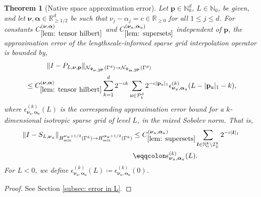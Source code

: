 \documentclass[pdflatex,sn-mathphys-num]{sn-jnl}%
\theoremstyle{thmstyleone}%
\newtheorem{theorem}{Theorem}%
\theoremstyle{thmstyletwo}%
\theoremstyle{thmstylethree}%
\begin{document}
\begin{theorem}[Native space approximation error]\label{thm: error in L}
    Let \(\mathbf{p}\in\mathbb{N}_0^d\), \(L\in\mathbb{N}_0\), be given, and let \(\boldsymbol{\nu},\boldsymbol{\alpha}\in\mathbb{R}^d_{\geq1/2}\) be such that \(\nu_j-\alpha_j=c\in\mathbb{R}_{\geq0}\) for all \(1\leq j \leq d\). For constants \(C^{(\boldsymbol{\nu},\boldsymbol{\alpha})}_{\ref{lem: tensor hilbert}}\) and \(C_{\ref{lem: supersets}}^{(\boldsymbol{\nu}_{\mathfrak{u}},\boldsymbol{\alpha}_{\mathfrak{u}})}\) independent of \(\mathbf{p}\), the approximation error of the lengthscale-informed sparse grid interpolation operator is bounded by,
    \begin{align}
    \begin{split}
    &\qquad\quad\|I-P_{L,\boldsymbol{\nu},\mathbf{p}}\|_{\mathcal{N}_{\Phi_{\boldsymbol{\nu},2^{\mathbf{p}}}}(\Gamma^d)\rightarrow\mathcal{N}_{\Phi_{\boldsymbol{\alpha},2^{\mathbf{p}}}}(\Gamma^d)}\\
    &\leq C^{(\boldsymbol{\nu},\boldsymbol{\alpha})}_{\ref{lem: tensor hilbert}}\sum_{k=1}^d2^{-ck}\sum_{\mathfrak{u}\in\mathcal{P}^d_k}2^{-c|\mathbf{p}_{\mathfrak{u}}|_1}\epsilon^{(k)}_{\boldsymbol{\nu}_{\mathfrak{u}},\boldsymbol{\alpha}_{\mathfrak
    {u}}}(L-|\mathbf{p}_{\mathfrak{u}}|_1-k),
    \end{split}\nonumber
    \end{align}
    where \(\epsilon^{(k)}_{\boldsymbol{\nu}_{\mathfrak{u}},\boldsymbol{\alpha}_{\mathfrak{u}}}(L)\) is the corresponding approximation error bound for a \(k\)-dimensional isotropic sparse grid of level \(L\), in the mixed Sobolev norm. That is,
    \begin{align}
    \|I-S_{L,\boldsymbol{\nu}_{\mathfrak{u}}}\|_{H_{\textrm{mix}}^{\boldsymbol{\nu}_{\mathfrak{u}}+1/2}(\Gamma^k)\rightarrow H_{\textrm{mix}}^{\boldsymbol{\alpha}_{\mathfrak{u}}+1/2}(\Gamma^k)}&\leq C_{\ref{lem: supersets}}^{(\boldsymbol{\nu}_{\mathfrak{u}},\boldsymbol{\alpha}_{\mathfrak{u}})}\sum_{\boldsymbol{l}\in\mathbb{N}_0^k\setminus\mathcal{I}_{L}^k}2^{-c|\boldsymbol{l}|_1}\nonumber\\
    &\eqqcolon\epsilon^{(k)}_{\boldsymbol{\nu}_{\mathfrak{u}},\boldsymbol{\alpha}_{\mathfrak{u}}}(L)\nonumber.
    \end{align}
    For \(L<0\), we define \(\epsilon^{(k)}_{\boldsymbol{\nu}_{\mathfrak{u}},\boldsymbol{\alpha}_{\mathfrak{u}}}(L)\coloneqq\epsilon^{(k)}_{\boldsymbol{\nu}_{\mathfrak{u}},\boldsymbol{\alpha}_{\mathfrak{u}}}(0)\).
\end{theorem}
\begin{proof}
    See Section \ref{subsec: error in L}.
\end{proof}
\end{document}
